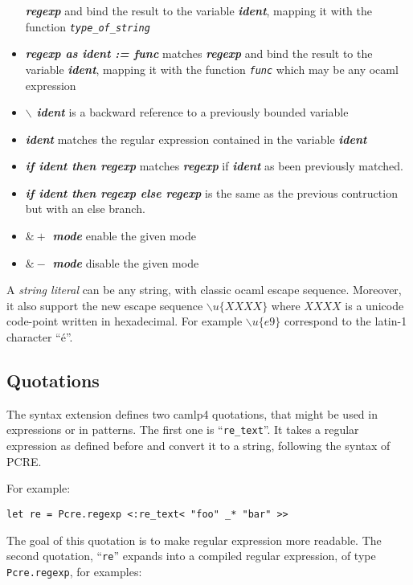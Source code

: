 \documentclass{article}
\begin{document}
\begin{itemize}
  \textbf{\emph{regexp}} and bind the result to the variable
  \textbf{\emph{ident}}, mapping it with the function
  \texttt{\emph{type\_of\_string}}
\item \textbf{\emph{regexp as ident := func}} matches
  \textbf{\emph{regexp}} and bind the result to the variable
  \textbf{\emph{ident}}, mapping it with the function
  \texttt{\emph{func}} which may be any ocaml expression
\item \textbf{\emph{$\backslash$ ident}} is a backward reference to a
  previously bounded variable
\item \textbf{\emph{ident}} matches the regular expression contained
  in the variable \textbf{\emph{ident}}
\item \textbf{\emph{if ident then regexp}} matches
  \textbf{\emph{regexp}} if \textbf{\emph{ident}} as been previously
  matched.
\item \textbf{\emph{if ident then regexp else regexp}} is the same as
  the previous contruction but with an else branch.
\item \textbf{\emph{$\&+$ mode}} enable the given mode
\item \textbf{\emph{$\&-$ mode}} disable the given mode
\end{itemize}

A \emph{string literal} can be any string, with classic ocaml escape
sequence. Moreover, it also support the new escape sequence
$\backslash u\{XXXX\}$ where $XXXX$ is a unicode code-point written in
hexadecimal. For example $\backslash u\{e9\}$ correspond to the
latin-1 character ``é''.

\subsection{Quotations}

The syntax extension defines two camlp4 quotations, that might be used
in expressions or in patterns. The first one is
``\texttt{re\_text}''. It takes a regular expression as defined before
and convert it to a string, following the syntax of PCRE.

For example:

\lstset{language=[Objective]Caml}\begin{lstlisting}
let re = Pcre.regexp <:re_text< "foo" _* "bar" >>
\end{lstlisting}

The goal of this quotation is to make regular expression more
readable. The second quotation, ``\texttt{re}'' expands into a
compiled regular expression, of type \texttt{Pcre.regexp}, for examples:
\end{document}
